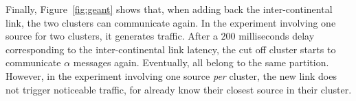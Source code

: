 \begin{asparadesc}
\noindent Finally, Figure~\ref{fig:geant} shows that, when adding back the
inter-continental link, the two clusters can communicate again. In the
experiment involving one source for two clusters, it generates
traffic. After a $200$ milliseconds delay corresponding to the inter-continental link
latency, the cut off cluster starts to communicate $\alpha$ messages
again. Eventually, all \processes belong to the same
partition. However, in the experiment involving one source \emph{per}
cluster, the new link does not trigger noticeable traffic, for
\processes already know their closest source in their cluster.

\end{asparadesc}

    

    
